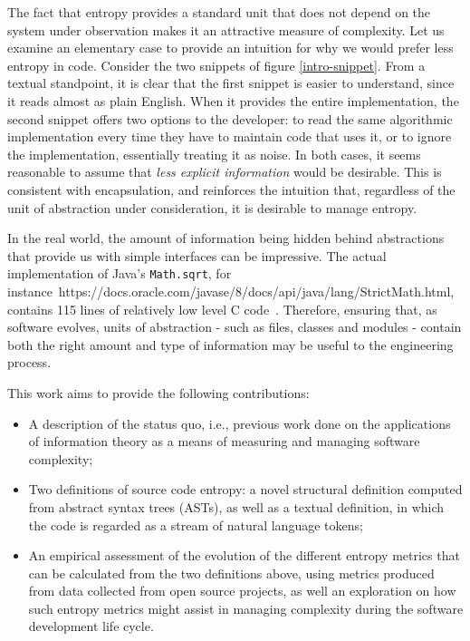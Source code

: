 \documentclass[10pt,conference]{IEEEtran}
\begin{document}
The fact that entropy provides a standard unit that does not depend on the system under observation makes it an attractive measure of complexity. Let us examine an elementary case to provide an intuition for why we would prefer less entropy in code. Consider the two snippets of figure \ref{intro-snippet}. From a textual standpoint, it is clear that the first snippet is easier to understand, since it reads almost as plain English. When it provides the entire implementation, the second snippet offers two options to the developer: to read the same algorithmic implementation every time they have to maintain code that uses it, or to ignore the implementation, essentially treating it as noise. In both cases, it seems reasonable to assume that \textit{less explicit information} would be desirable. This is consistent with encapsulation, and reinforces the intuition that, regardless of the unit of abstraction under consideration, it is desirable to manage entropy.

In the real world, the amount of information being hidden behind abstractions that provide us with simple interfaces can be impressive. The actual implementation of Java's \texttt{Math.sqrt}, for instance~https://docs.oracle.com/javase/8/docs/api/java/lang/StrictMath.html, contains 115 lines of relatively low level C code~\cite{soJavaSqrt}. Therefore, ensuring that, as software evolves, units of abstraction  - such as files, classes and modules - contain both the right amount and type of information may be useful to the engineering process.

This work aims to provide the following contributions:
\begin{itemize}
    \item A description of the status quo, i.e., previous work done on the applications of information theory as a means of measuring and managing software complexity;
    \item Two definitions of source code entropy: a novel structural definition computed from abstract syntax trees (ASTs), as well as a textual definition, in which the code is regarded as a stream of natural language tokens;
    \item An empirical assessment of the evolution of the different entropy metrics that can be calculated from the two definitions above, using metrics produced from data collected from open source projects, as well an exploration on how such entropy metrics might assist in managing complexity during the software development life cycle.
\end{itemize}
\end{document}
